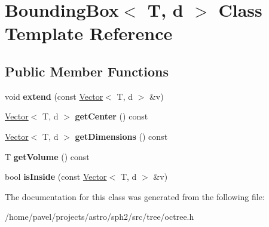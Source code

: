 \hypertarget{classBoundingBox}{}\section{Bounding\+Box$<$ T, d $>$ Class Template Reference}
\label{classBoundingBox}
\subsection*{Public Member Functions}
\begin{DoxyCompactItemize}
\item 
\hypertarget{classBoundingBox_a918f0921f2ce317b1297db352292d4cd}{}\label{classBoundingBox_a918f0921f2ce317b1297db352292d4cd} 
void {\bfseries extend} (const \hyperlink{classBasicVector}{Vector}$<$ T, d $>$ \&v)
\item 
\hypertarget{classBoundingBox_a984f46b3ad79777f4051153e5549ee95}{}\label{classBoundingBox_a984f46b3ad79777f4051153e5549ee95} 
\hyperlink{classBasicVector}{Vector}$<$ T, d $>$ {\bfseries get\+Center} () const
\item 
\hypertarget{classBoundingBox_ada34d9a68df6943dba6704f9c49f4204}{}\label{classBoundingBox_ada34d9a68df6943dba6704f9c49f4204} 
\hyperlink{classBasicVector}{Vector}$<$ T, d $>$ {\bfseries get\+Dimensions} () const
\item 
\hypertarget{classBoundingBox_adab07a904560034560b6c4b0d870338e}{}\label{classBoundingBox_adab07a904560034560b6c4b0d870338e} 
T {\bfseries get\+Volume} () const
\item 
\hypertarget{classBoundingBox_a9d99863e7febbee132cab18948be42e7}{}\label{classBoundingBox_a9d99863e7febbee132cab18948be42e7} 
bool {\bfseries is\+Inside} (const \hyperlink{classBasicVector}{Vector}$<$ T, d $>$ \&v)
\end{DoxyCompactItemize}


The documentation for this class was generated from the following file\+:\begin{DoxyCompactItemize}
\item 
/home/pavel/projects/astro/sph2/src/tree/octree.\+h\end{DoxyCompactItemize}
